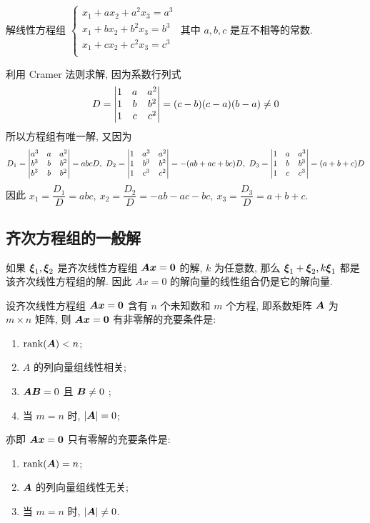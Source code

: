 \begin{example}[2005 华中科技大学]
    解线性方程组 $\begin{cases}
            x_1+ax_2+a^2x_3=a^3 \\
            x_1+bx_2+b^2x_3=b^3 \\
            x_1+cx_2+c^2x_3=c^3 \\
        \end{cases}$
    其中 $a,b,c$ 是互不相等的常数.
\end{example}
\begin{solution}
    利用 Cramer 法则求解, 因为系数行列式 $$D=\mqty|1&a&a^2\\1&b&b^2\\1&c&c^2|=(c-b)(c-a)(b-a)\neq0$$
    所以方程组有唯一解, 又因为
    $$D_1=\mqty|a^3&a&a^2\\b^3&b&b^2\\b^3&b&b^2|=abcD,~D_2=\mqty|1&a^3&a^2\\1&b^3&b^2\\1&c^3&c^2|=-(ab+ac+bc)D,~D_3=\mqty|1&a&a^3\\1&b&b^3\\1&c&c^3|=(a+b+c)D$$
    因此 $x_1=\dfrac{D_1}{D}=abc,~x_2=\dfrac{D_2}{D}=-ab-ac-bc,~x_3=\dfrac{D_3}{D}=a+b+c.$
\end{solution}

\subsection{齐次方程组的一般解}

\begin{theorem}[齐次解的线性组合]
    如果 $ \vb*{\xi}_{1}, \vb*{\xi}_{2} $ 是齐次线性方程组 $ \vb*{Ax}=\vb*{0} $ 的解, $ k $ 为任意数, 那么 $ \vb*{\xi}_{1}+\vb*{\xi}_{2}, k \vb*{\xi}_{1} $ 都是该齐次线性方程组的解. 因此 $ A x=0 $ 的解向量的线性组合仍是它的解向量.
\end{theorem}

\begin{theorem}[零解与非零解的充要条件]
    设齐次线性方程组 $ \vb*{Ax}=\vb*{0} $ 含有 $ n $ 个未知数和 $ m $ 个方程, 即系数矩阵 $ \vb*{A} $ 为 $ m \times n$ 矩阵, 则 $ \vb*{A x}=\vb*{0} $ 有非零解的充要条件是:
    \begin{enumerate}[label=(\arabic{*})]
        \item $\rank(\vb*{A})<n $;
        \item $A $ 的列向量组线性相关;
        \item $\vb*{A B}=0 $ 且 $ \vb*{B} \neq 0$ ;
        \item 当 $ m=n $ 时, $ |\vb*{A}|=0 $;
    \end{enumerate}
    亦即 $ \vb*{A x}=\vb*{0} $ 只有零解的充要条件是:
    \begin{enumerate}[label=(\arabic{*})]
        \item $\rank(\vb*{A})=n$;
        \item $\vb*{A} $ 的列向量组线性无关;
        \item 当 $ m=n $ 时, $ |\vb*{A}| \neq 0 $.
    \end{enumerate}
\end{theorem}

